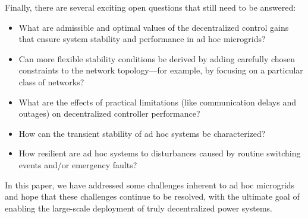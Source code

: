 \documentclass[letterpaper, 10 pt, conference]{ieeeconf}
\begin{document}
Finally, there are several exciting open questions that still need to be answered:
\begin{itemize}
    \item What are admissible and optimal values of the decentralized control gains that ensure system stability and performance in ad hoc microgrids?
    \item Can more flexible stability conditions be derived by adding carefully chosen constraints to the network topology---for example, by focusing on a particular class of networks?
    \item What are the effects of practical limitations (like communication delays and outages) on decentralized controller performance?
    \item How can the transient stability of ad hoc systems be characterized?
    \item How resilient are ad hoc systems to disturbances caused by routine switching events and/or emergency faults?
\end{itemize}

In this paper, we have addressed some challenges inherent to ad hoc microgrids and hope that these challenges continue to be resolved, with the ultimate goal of enabling the large-scale deployment of truly decentralized power systems.
\end{document}
